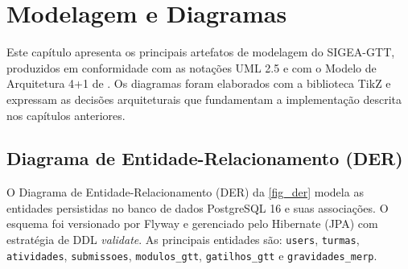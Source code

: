\chapter{Modelagem e Diagramas}
\label{cap_modelagem}

Este capítulo apresenta os principais artefatos de modelagem do SIGEA-GTT,
produzidos em conformidade com as notações UML 2.5 \cite{booch2005} e com o
Modelo de Arquitetura 4+1 de . Os diagramas foram
elaborados com a biblioteca TikZ e expressam as decisões arquiteturais que
fundamentam a implementação descrita nos capítulos anteriores.

\section{Diagrama de Entidade-Relacionamento (DER)}
\label{sec_der}

O Diagrama de Entidade-Relacionamento (DER) da \autoref{fig_der} modela as
entidades persistidas no banco de dados PostgreSQL 16 e suas associações.
O esquema foi versionado por Flyway e gerenciado pelo Hibernate (JPA) com
estratégia de DDL \textit{validate}. As principais entidades são:
\texttt{users}, \texttt{turmas}, \texttt{atividades}, \texttt{submissoes},
\texttt{modulos\_gtt}, \texttt{gatilhos\_gtt} e \texttt{gravidades\_merp}.

